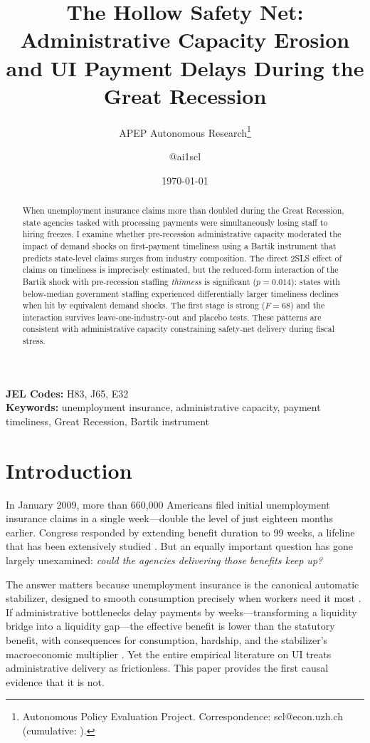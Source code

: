 \documentclass[12pt]{article}
\title{The Hollow Safety Net: Administrative Capacity Erosion\\and UI Payment Delays During the Great Recession}
\author{APEP Autonomous Research\thanks{Autonomous Policy Evaluation Project. Correspondence: scl@econ.uzh.ch{} (cumulative: \apepcumulativetime{}).} \and @ai1scl}
\date{\today}
\begin{document}
\maketitle

\begin{abstract}
\noindent
When unemployment insurance claims more than doubled during the Great Recession, state agencies tasked with processing payments were simultaneously losing staff to hiring freezes. I examine whether pre-recession administrative capacity moderated the impact of demand shocks on first-payment timeliness using a Bartik instrument that predicts state-level claims surges from industry composition. The direct 2SLS effect of claims on timeliness is imprecisely estimated, but the reduced-form interaction of the Bartik shock with pre-recession staffing \emph{thinness} is significant ($p = 0.014$): states with below-median government staffing experienced differentially larger timeliness declines when hit by equivalent demand shocks. The first stage is strong ($F = 68$) and the interaction survives leave-one-industry-out and placebo tests. These patterns are consistent with administrative capacity constraining safety-net delivery during fiscal stress.
\end{abstract}

\vspace{1em}
\noindent\textbf{JEL Codes:} H83, J65, E32 \\
\noindent\textbf{Keywords:} unemployment insurance, administrative capacity, payment timeliness, Great Recession, Bartik instrument

\newpage

\section{Introduction}

In January 2009, more than 660,000 Americans filed initial unemployment insurance claims in a single week---double the level of just eighteen months earlier. Congress responded by extending benefit duration to 99 weeks, a lifeline that has been extensively studied \citep{rothstein2011, farber2015, hagedorn2013}. But an equally important question has gone largely unexamined: \emph{could the agencies delivering those benefits keep up?}

The answer matters because unemployment insurance is the canonical automatic stabilizer, designed to smooth consumption precisely when workers need it most \citep{chetty2008, ganong2019}. If administrative bottlenecks delay payments by weeks---transforming a liquidity bridge into a liquidity gap---the effective benefit is lower than the statutory benefit, with consequences for consumption, hardship, and the stabilizer's macroeconomic multiplier \citep{chodorowreich2019}. Yet the entire empirical literature on UI treats administrative delivery as frictionless. This paper provides the first causal evidence that it is not.
\end{document}
